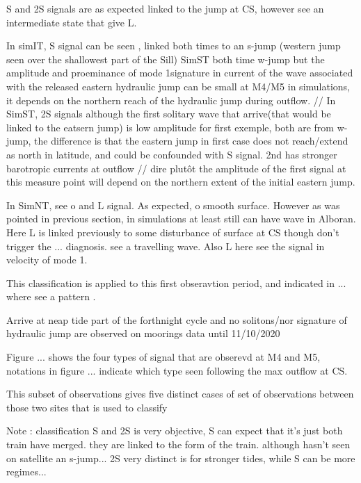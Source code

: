  S and 2S signals are as expected linked to the jump at CS, however see an intermediate state that give L.

 In simIT, S signal can be seen , linked both times to an s-jump (western jump seen over the shallowest part of the Sill)
 SimST both time w-jump but the amplitude and proeminance of mode 1signature in current of the wave associated with the released eastern hydraulic jump can be small at M4/M5 in simulations, it depends on the northern reach of the hydraulic jump during outflow.  // In SimST, 2S signals although the first solitary wave that arrive(that would be linked to the eatsern jump) is low amplitude for first exemple, both are from w-jump, the difference is that the eastern jump in first case does not reach/extend as north in latitude, and could be confounded with S signal. 2nd has stronger barotropic currents at outflow // dire plutôt the amplitude of the first signal at this measure point will depend on the northern extent of the initial eastern jump.
 
 
In SimNT, see o and L signal. As expected, o smooth surface. However as was pointed in previous section, in simulations at least still can have wave in Alboran. Here L is linked previously to some disturbance of surface at CS though don't trigger the ... diagnosis. see a travelling wave. Also L here see the signal in velocity of mode 1.

This classification is applied to this first obseravtion period, and indicated in ... where see a pattern .


Arrive at neap tide part of the forthnight cycle and no solitons/nor signature of hydraulic jump are observed on moorings data until 11/10/2020 




Figure ... shows the four types of signal that are obserevd at M4 and M5, notations in figure ... indicate which type seen following the max outflow at CS. 



This subset of observations gives five distinct cases of set of observations between those two sites that is used to classify 

Note : classification S and 2S is very objective, S can expect that it's just both train have merged. they are linked to the form of the train. although hasn't seen on satellite an s-jump...  2S very distinct is for stronger tides, while S can be more regimes...






